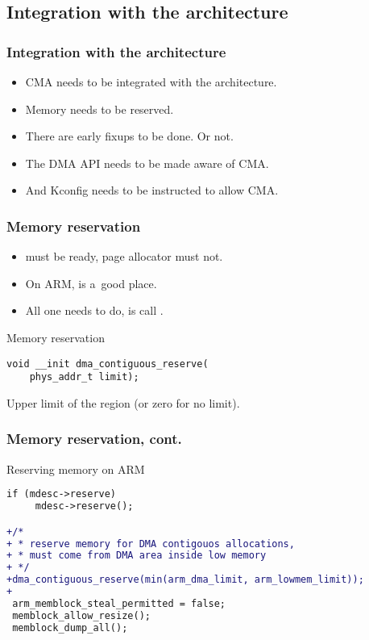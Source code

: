 \subsection{Integration with the architecture}

\begin{frame}
  \frametitle{Integration with the architecture}

  \begin{itemize}
  \item CMA needs to be integrated with the architecture.
  \item Memory needs to be reserved.
  \item There are early fixups to be done. {\footnotesize Or not.}
  \item The DMA API needs to be made aware of CMA.
  \item And Kconfig needs to be instructed to allow CMA.
  \end{itemize}
\end{frame}

\begin{frame}[fragile]
  \frametitle{Memory reservation}

  \begin{itemize}
  \item {} must be ready, page allocator must not.
  \item On ARM,  is a~good place.
  \item All one needs to do, is call
    .
  \end{itemize}

  \begin{block}{Memory reservation}
\begin{lstlisting}
void __init dma_contiguous_reserve(
    phys_addr_t limit);
\end{lstlisting}
  \end{block}

  \begin{description}[limitAA]
  \item[{\ttfamily limit}] Upper limit of the region (or zero for no
    limit).
  \end{description}

\end{frame}

\begin{frame}[fragile]
  \frametitle{Memory reservation, cont.}

  \begin{block}{Reserving memory on ARM}
\begin{lstlisting}[language=diff]
 if (mdesc->reserve)
     mdesc->reserve();

+/*
+ * reserve memory for DMA contigouos allocations,
+ * must come from DMA area inside low memory
+ */
+dma_contiguous_reserve(min(arm_dma_limit, arm_lowmem_limit));
+
 arm_memblock_steal_permitted = false;
 memblock_allow_resize();
 memblock_dump_all();
\end{lstlisting}
  \end{block}
\end{frame}

